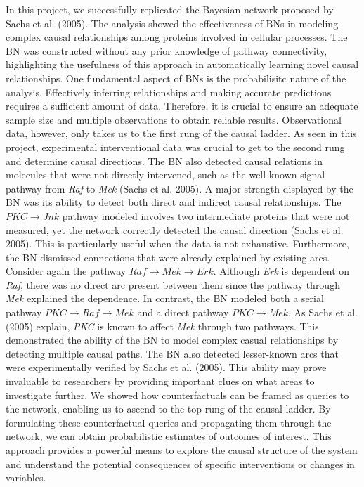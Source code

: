\documentclass[twocol]{ametsoc}
\begin{document}
In this project, we successfully replicated the Bayesian network
proposed by Sachs et al. (2005). The analysis showed the effectiveness
of BNs in modeling complex causal relationships among proteins involved
in cellular processes. The BN was constructed without any prior
knowledge of pathway connectivity, highlighting the usefulness of this
approach in automatically learning novel causal relationships. One
fundamental aspect of BNs is the probabilisitc nature of the analysis.
Effectively inferring relationships and making accurate predictions
requires a sufficient amount of data. Therefore, it is crucial to ensure
an adequate sample size and multiple observations to obtain reliable
results. Observational data, however, only takes us to the first rung of
the causal ladder. As seen in this project, experimental interventional
data was crucial to get to the second rung and determine causal
directions. The BN also detected causal relations in molecules that were
not directly intervened, such as the well-known signal pathway from
\emph{Raf} to \emph{Mek} (Sachs et al. 2005). A major strength displayed
by the BN was its ability to detect both direct and indirect causal
relationships. The \(PKC \to Jnk\) pathway modeled involves two
intermediate proteins that were not measured, yet the network correctly
detected the causal direction (Sachs et al. 2005). This is particularly
useful when the data is not exhaustive. Furthermore, the BN dismissed
connections that were already explained by existing arcs. Consider again
the pathway \(Raf \to Mek \to Erk\). Although \emph{Erk} is dependent on
\emph{Raf}, there was no direct arc present between them since the
pathway through \emph{Mek} explained the dependence. In contrast, the BN
modeled both a serial pathway \(PKC \to Raf \to Mek\) and a direct
pathway \(PKC \to Mek\). As Sachs et al. (2005) explain, \emph{PKC} is
known to affect \emph{Mek} through two pathways. This demonstrated the
ability of the BN to model complex casual relationships by detecting
multiple causal paths. The BN also detected lesser-known arcs that were
experimentally verified by Sachs et al. (2005). This ability may prove
invaluable to researchers by providing important clues on what areas to
investigate further. We showed how counterfactuals can be framed as
queries to the network, enabling us to ascend to the top rung of the
causal ladder. By formulating these counterfactual queries and
propagating them through the network, we can obtain probabilistic
estimates of outcomes of interest. This approach provides a powerful
means to explore the causal structure of the system and understand the
potential consequences of specific interventions or changes in
variables.
\end{document}
